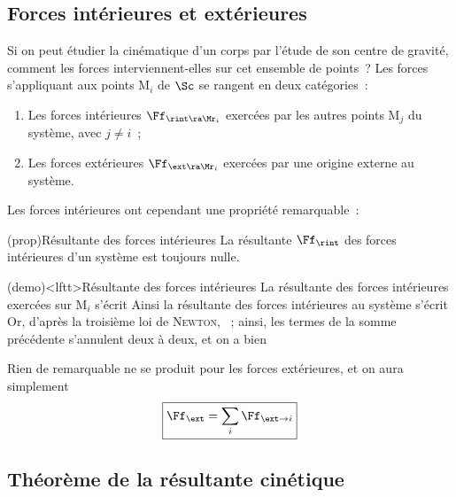 \documentclass[../../main/main.tex]{subfiles}
\begin{document}
\subsection{Forces intérieures et extérieures}
Si on peut étudier la cinématique d'un corps par l'étude de son centre de
gravité, comment les forces interviennent-elles sur cet ensemble de points~?
Les forces s'appliquant aux points M$_i$ de $\Sc$ se rangent en deux
catégories~:
\begin{enumerate}
	\item Les forces intérieures $\Ff_{\rint\ra\Mr_i}$ exercées par les autres
	      points M$_j$ du système, avec $j\neq i$~;
	\item Les forces extérieures $\Ff_{\ext\ra\Mr_i}$ exercées par une origine
	      externe au système.
\end{enumerate}
Les forces intérieures ont cependant une propriété remarquable~:
\begin{tcb*}(prop){Résultante des forces intérieures}
	La résultante $\Ff_{\rint}$ des forces intérieures d'un système est toujours
	nulle.
\end{tcb*}
\begin{tcb*}(demo)<lftt>{Résultante des forces intérieures}
	La résultante des forces intérieures exercées sur M$_i$ s'écrit
	\psw{
		\[
			\Ff_{\rint\ra i} = \sum_{j\neq i}\Ff_{j\ra i}
		\]
	}%
	Ainsi la résultante des forces intérieures au système s'écrit
	\psw{
		\[
			\Ff_{\rint} = \sum_i \Ff_{\rint\to i} = \sum_i\sum_{j\neq i}\Ff_{j\to
				i}
		\]
	}%
	Or, d'après la troisième loi de \textsc{Newton}, ~; ainsi, les termes de la somme précédente
	s'annulent deux à deux, et on a bien
	\vspace{-15pt}
\end{tcb*}
Rien de remarquable ne se produit pour les forces extérieures, et on aura
simplement
\[\boxed{\Ff_{\ext} = \sum_i \Ff_{\ext\to i}}\]

\subsection{Théorème de la résultante cinétique}
\end{document}

